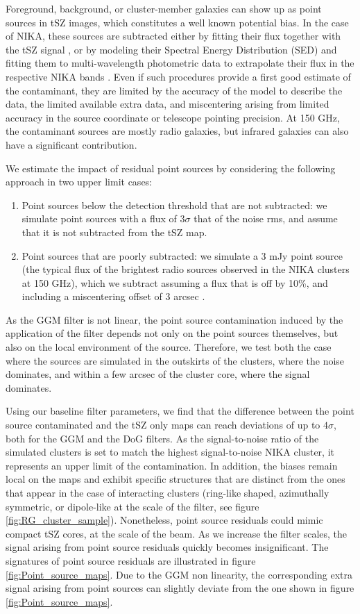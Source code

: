 \documentclass[twocolumn,traditabstract]{aa}
\begin{document}
Foreground, background, or cluster-member galaxies can show up as point sources in tSZ images, which constitutes a well known potential bias. In the case of NIKA, these sources are subtracted either by fitting their flux together with the tSZ signal \citep{Adam2015}, or by modeling their Spectral Energy Distribution (SED) and fitting them to multi-wavelength photometric data to extrapolate their flux in the respective NIKA bands \citep[see the method detailed in][]{Adam2016a}. Even if such procedures provide a first good estimate of the contaminant, they are limited by the accuracy of the model to describe the data, the limited available extra data, and miscentering arising from limited accuracy in the source coordinate or telescope pointing precision. At 150 GHz, the contaminant sources are mostly radio galaxies, but infrared galaxies can also have a significant contribution.

We estimate the impact of residual point sources by considering the following approach in two upper limit cases:
\begin{enumerate} 
\item Point sources below the detection threshold that are not subtracted: we simulate point sources with a flux of $3 \sigma$ that of the noise rms, and assume that it is not subtracted from the tSZ map. 
\item Point sources that are poorly subtracted: we simulate a 3 mJy point source (the typical flux of the brightest radio sources observed in the NIKA clusters at 150 GHz), which we subtract assuming a flux that is off by 10\%, and including a miscentering offset of 3 arcsec \citep[the NIKA pointing accuracy for one scan][]{Catalano2014}.
\end{enumerate}
As the GGM filter is not linear, the point source contamination induced by the application of the filter depends not only on the point sources themselves, but also on the local environment of the source. Therefore, we test both the case where the sources are simulated in the outskirts of the clusters, where the noise dominates, and within a few arcsec of the cluster core, where the signal dominates.

Using our baseline filter parameters, we find that the difference between the point source contaminated and the tSZ only maps can reach deviations of up to $4 \sigma$, both for the GGM and the DoG filters. As the signal-to-noise ratio of the simulated clusters is set to match the highest signal-to-noise NIKA cluster, it represents an upper limit of the contamination. In addition, the biases remain local on the maps and exhibit specific structures that are distinct from the ones that appear in the case of interacting clusters (ring-like shaped, azimuthally symmetric, or dipole-like at the scale of the filter, see figure \ref{fig:RG_cluster_sample}). Nonetheless, point source residuals could mimic compact tSZ cores, at the scale of the beam. As we increase the filter scales, the signal arising from point source residuals quickly becomes insignificant. The signatures of point source residuals are illustrated in figure \ref{fig:Point_source_maps}. Due to the GGM non linearity, the corresponding extra signal arising from point sources can slightly deviate from the one shown in figure \ref{fig:Point_source_maps}.
\end{document}
